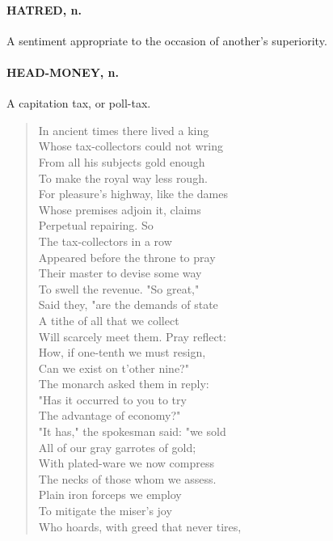 \documentclass[11pt]{article}
\begin{document}
\paragraph{HATRED, n.}  A sentiment appropriate to the occasion of another's
superiority.

\paragraph{HEAD-MONEY, n.}  A capitation tax, or poll-tax.

\begin{quote}   In ancient times there lived a king \\
  Whose tax-collectors could not wring \\
  From all his subjects gold enough \\
  To make the royal way less rough. \\
  For pleasure's highway, like the dames \\
  Whose premises adjoin it, claims \\
  Perpetual repairing.  So \\
  The tax-collectors in a row \\
  Appeared before the throne to pray \\
  Their master to devise some way \\
  To swell the revenue.  "So great," \\
  Said they, "are the demands of state \\
  A tithe of all that we collect \\
  Will scarcely meet them.  Pray reflect: \\
  How, if one-tenth we must resign, \\
  Can we exist on t'other nine?" \\
  The monarch asked them in reply: \\
  "Has it occurred to you to try \\
  The advantage of economy?" \\
  "It has," the spokesman said:  "we sold \\
  All of our gray garrotes of gold; \\
  With plated-ware we now compress \\
  The necks of those whom we assess. \\
  Plain iron forceps we employ \\
  To mitigate the miser's joy \\
  Who hoards, with greed that never tires, \\

\end{quote}
\end{document}
